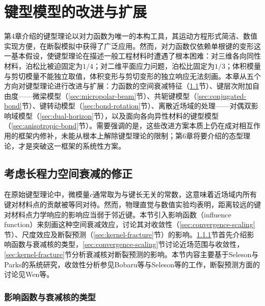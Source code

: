 \chapter{键型模型的改进与扩展}

第4章介绍的键型理论以对力函数为唯一的本构工具，其运动方程形式简洁、数值实现方便，在断裂模拟中获得了广泛应用。然而，对力函数仅依赖单根键的变形这一基本假设，使键型理论在描述一般工程材料时遭遇了根本困难：对三维各向同性材料，泊松比被迫固定为$1/4$；对二维平面应力问题，泊松比固定为$1/3$；体积模量与剪切模量不能独立取值，体积变形与剪切变形的独立响应无法刻画。本章从五个方向对键型理论进行改进与扩展：力函数的空间衰减特征（\ref{sec:influence-function}节）、键层次附加自由度——微梁模型（\ref{sec:micropolar-beam}节）、共轭键模型（\ref{sec:conjugated-bond}节）、键转动模型（\ref{sec:bond-rotation}节）、离散近场域的处理——对偶双影响域模型（\ref{sec:dual-horizon}节），以及面向各向异性材料的键型模型（\ref{sec:anisotropic-bond}节）。需要强调的是，这些改进方案本质上仍在成对相互作用的框架内修补，未能从根本上解除键型理论的限制；第6章将要介绍的态型理论，才是突破这一框架的系统性方案。

\section{考虑长程力空间衰减的修正}\label{sec:influence-function}

在原始键型理论中，微模量$c$通常取为与键长无关的常数，这意味着近场域内所有键对材料点的贡献被等同对待。然而，物理直觉与数值实验均表明，距离较远的键对材料点力学响应的影响应当弱于邻近键。本节引入影响函数（influence function）来刻画这种空间衰减效应，讨论其对收敛性（\ref{sec:convergence-scaling}节）、尺度效应及断裂预测（\ref{sec:kernel-fracture}节）的影响。\ref{sec:kernel-types}节首先介绍影响函数与衰减核的类型，\ref{sec:convergence-scaling}节讨论近场范围与收敛性，\ref{sec:kernel-fracture}节分析衰减核对断裂预测的影响。本节内容主要基于Seleson与Parks的系统研究\cite{SelesonParks2011}，收敛性分析参见Bobaru等\cite{Bobaru2009}与Seleson等\cite{SelesonLittlewood2016}的工作，断裂预测方面的讨论见Wen等\cite{EWF2023}。

\subsection{影响函数与衰减核的类型}\label{sec:kernel-types}

